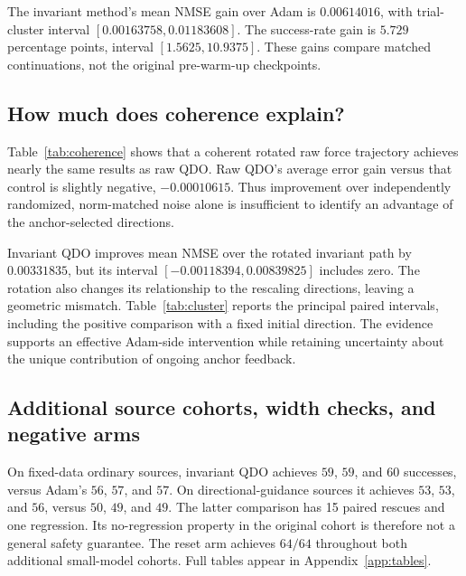 \documentclass[11pt,letterpaper]{article}
\theoremstyle{remark}\newtheorem{remark}{Remark}
\begin{document}
The invariant method's mean NMSE gain over Adam is $0.00614016$, with trial-cluster interval $[0.00163758,0.01183608]$. The success-rate gain is $5.729$ percentage points, interval $[1.5625,10.9375]$. These gains compare matched continuations, not the original pre-warm-up checkpoints.

\subsection{How much does coherence explain?}
Table~\ref{tab:coherence} shows that a coherent rotated raw force trajectory achieves nearly the same results as raw QDO. Raw QDO's average error gain versus that control is slightly negative, $-0.00010615$. Thus improvement over independently randomized, norm-matched noise alone is insufficient to identify an advantage of the anchor-selected directions.

Invariant QDO improves mean NMSE over the rotated invariant path by $0.00331835$, but its interval $[-0.00118394,0.00839825]$ includes zero. The rotation also changes its relationship to the rescaling directions, leaving a geometric mismatch. Table~\ref{tab:cluster} reports the principal paired intervals, including the positive comparison with a fixed initial direction. The evidence supports an effective Adam-side intervention while retaining uncertainty about the unique contribution of ongoing anchor feedback.

\begin{table}[tb]
\centering\small\setlength{\tabcolsep}{4pt}

\caption{Later coherence controls on the original width-four cohort. All use donor force norms and paired training streams. A fixed rotation preserves auxiliary path geometry but not necessarily its relation to the model's rescaling modes or task gradients.}\label{tab:coherence}
\end{table}
\begin{table}[tb]
\centering\small\setlength{\tabcolsep}{4pt}

\caption{Exploratory paired NMSE gains, control minus target. Positive values favor the target. Bootstrap resampling is by original trial after averaging its three restarts.}\label{tab:cluster}
\end{table}

\subsection{Additional source cohorts, width checks, and negative arms}
On fixed-data ordinary sources, invariant QDO achieves $59$, $59$, and $60$ successes, versus Adam's $56$, $57$, and $57$. On directional-guidance sources it achieves $53$, $53$, and $56$, versus $50$, $49$, and $49$. The latter comparison has 15 paired rescues and one regression. Its no-regression property in the original cohort is therefore not a general safety guarantee. The reset arm achieves $64/64$ throughout both additional small-model cohorts. Full tables appear in Appendix~\ref{app:tables}.
\end{document}
